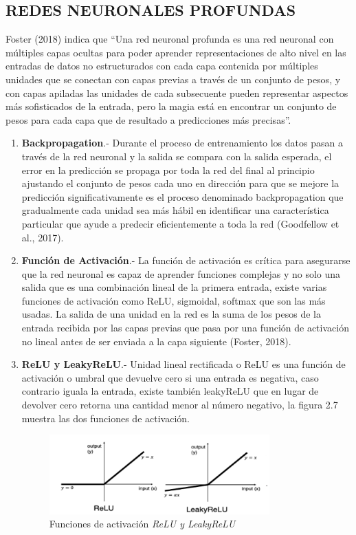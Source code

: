 \documentclass[letter, openright, 12pt]{book}
\newcommand*\setcaptioncitation[1]{\def\captioncitation{\textit{Fuente:}~#1}}
\let\captioncitation\relax
\begin{document}
\subsection{REDES NEURONALES PROFUNDAS}
Foster (2018) indica que “Una red neuronal profunda es una red neuronal con múltiples capas ocultas para poder aprender representaciones de alto nivel en las entradas de datos no estructurados con cada capa contenida por múltiples unidades que se conectan con capas previas a través de un conjunto de pesos, y con capas apiladas las unidades de cada subsecuente pueden representar aspectos más sofisticados de la entrada, pero la magia está en encontrar un conjunto de pesos para cada capa que de resultado a predicciones más precisas”.

\begin{enumerate}[label=(\alph*)]
\item \textbf{Backpropagation}.- Durante el proceso de entrenamiento los datos pasan a través de la red neuronal y la salida se compara con la salida esperada, el error en la predicción se propaga por toda la red del final al principio ajustando el conjunto de pesos cada uno en dirección para que se mejore la predicción significativamente es el proceso denominado backpropagation que gradualmente cada unidad sea más hábil en identificar una característica particular que ayude a predecir eficientemente a toda la red  (Goodfellow et al., 2017).
\item \textbf{Función de Activación}.- La función de activación es crítica para asegurarse que la red neuronal es capaz de aprender funciones complejas y no solo una salida que es una combinación lineal de la primera entrada, existe varias funciones de activación como ReLU, sigmoidal, softmax que son las más usadas. La salida de una unidad en la red es la suma de los pesos de la entrada recibida por las capas previas que pasa por una función de activación no lineal antes de ser enviada a la capa siguiente (Foster, 2018).
\item \textbf{ReLU y LeakyReLU}.- Unidad lineal rectificada o ReLU es una función de activación o umbral que devuelve cero si una entrada es negativa, caso contrario iguala la entrada, existe también leakyReLU que en lugar de devolver cero retorna una cantidad menor al número negativo, la figura 2.7 muestra las dos funciones de activación.

\begin{figure}[H]
\includegraphics[width=0.8\textwidth]{figura2_7}
\setcaptioncitation{(Foster, 2018)}
\caption{Funciones de activación \textit{ReLU y LeakyReLU} }
\label{tab:figura2_7} 
\end{figure}


\end{enumerate}
\end{document}
